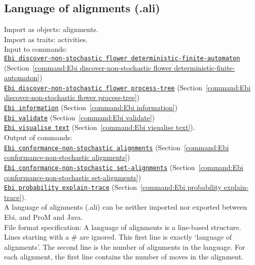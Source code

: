 {\subsection{Language of alignments (.ali)}
\label{filehandler:language of alignments}
Import as objects: alignments.
\\Import as traits: activities.
\\Input to commands: \\\null\qquad\hyperref[command:Ebi discover-non-stochastic flower deterministic-finite-automaton]{\texttt{Ebi discover-non-stochastic flower deterministic-finite-automaton}} (Section~\ref{command:Ebi discover-non-stochastic flower deterministic-finite-automaton})\\\null\qquad\hyperref[command:Ebi discover-non-stochastic flower process-tree]{\texttt{Ebi discover-non-stochastic flower process-tree}} (Section~\ref{command:Ebi discover-non-stochastic flower process-tree})\\\null\qquad\hyperref[command:Ebi information]{\texttt{Ebi information}} (Section~\ref{command:Ebi information})\\\null\qquad\hyperref[command:Ebi validate]{\texttt{Ebi validate}} (Section~\ref{command:Ebi validate})\\\null\qquad\hyperref[command:Ebi visualise text]{\texttt{Ebi visualise text}} (Section~\ref{command:Ebi visualise text}).
\\Output of commands: \\\null\qquad\hyperref[command:Ebi conformance-non-stochastic alignments]{\texttt{Ebi conformance-non-stochastic alignments}} (Section~\ref{command:Ebi conformance-non-stochastic alignments})\\\null\qquad\hyperref[command:Ebi conformance-non-stochastic set-alignments]{\texttt{Ebi conformance-non-stochastic set-alignments}} (Section~\ref{command:Ebi conformance-non-stochastic set-alignments})\\\null\qquad\hyperref[command:Ebi probability explain-trace]{\texttt{Ebi probability explain-trace}} (Section~\ref{command:Ebi probability explain-trace}).
\\A language of alignments (.ali) can be neither imported nor exported between Ebi, and ProM and Java.
\\File format specification:
A language of alignments is a line-based structure. Lines starting with a \# are ignored.
    This first line is exactly `language of alignments'.
    The second line is the number of alignments in the language.
    For each alignment, the first line contains the number of moves in the alignment.
}
